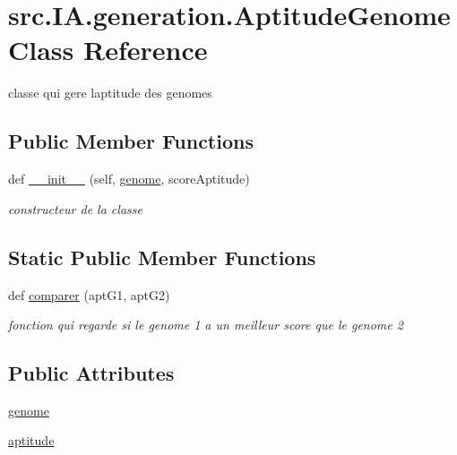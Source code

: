 \hypertarget{classsrc_1_1_i_a_1_1generation_1_1_aptitude_genome}{}\section{src.\+I\+A.\+generation.\+Aptitude\+Genome Class Reference}
\label{classsrc_1_1_i_a_1_1generation_1_1_aptitude_genome}


classe qui gere l\textquotesingle{}aptitude des genomes  


\subsection*{Public Member Functions}
\begin{DoxyCompactItemize}
\item 
def \hyperlink{classsrc_1_1_i_a_1_1generation_1_1_aptitude_genome_ab8fe94095f2097c8c79eb62ce49720e0}{\+\_\+\+\_\+init\+\_\+\+\_\+} (self, \hyperlink{classsrc_1_1_i_a_1_1generation_1_1_aptitude_genome_adb2ea447f40cd23fa32ac81d0fa0749f}{genome}, score\+Aptitude)
\begin{DoxyCompactList}\small\item\em constructeur de la classe \end{DoxyCompactList}\end{DoxyCompactItemize}
\subsection*{Static Public Member Functions}
\begin{DoxyCompactItemize}
\item 
def \hyperlink{classsrc_1_1_i_a_1_1generation_1_1_aptitude_genome_ac55819705900e2f15f4f064c4a2f3e19}{comparer} (apt\+G1, apt\+G2)
\begin{DoxyCompactList}\small\item\em fonction qui regarde si le genome 1 a un meilleur score que le genome 2 \end{DoxyCompactList}\end{DoxyCompactItemize}
\subsection*{Public Attributes}
\begin{DoxyCompactItemize}
\item 
\hyperlink{classsrc_1_1_i_a_1_1generation_1_1_aptitude_genome_adb2ea447f40cd23fa32ac81d0fa0749f}{genome}
\item 
\hyperlink{classsrc_1_1_i_a_1_1generation_1_1_aptitude_genome_a47dd54ce79c4991802651a85dc4c35e3}{aptitude}
\end{DoxyCompactItemize}


